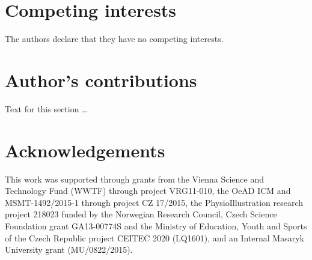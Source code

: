 \documentclass{bmcart}
\begin{document}
\begin{backmatter}

\section*{Competing interests}
  The authors declare that they have no competing interests.

\section*{Author's contributions}
    Text for this section \ldots

\section*{Acknowledgements}
This work was supported through grants from the Vienna Science and Technology Fund (WWTF) through project VRG11-010, the OeAD ICM and MSMT-1492/2015-1 through project CZ 17/2015, the PhysioIllustration research project 218023 funded by the Norwegian Research Council,  Czech Science Foundation grant GA13-00774S and the Ministry of Education, Youth and Sports of the Czech Republic project CEITEC 2020 (LQ1601), and an Internal Masaryk University grant (MU/0822/2015).



\end{backmatter}
\end{document}
